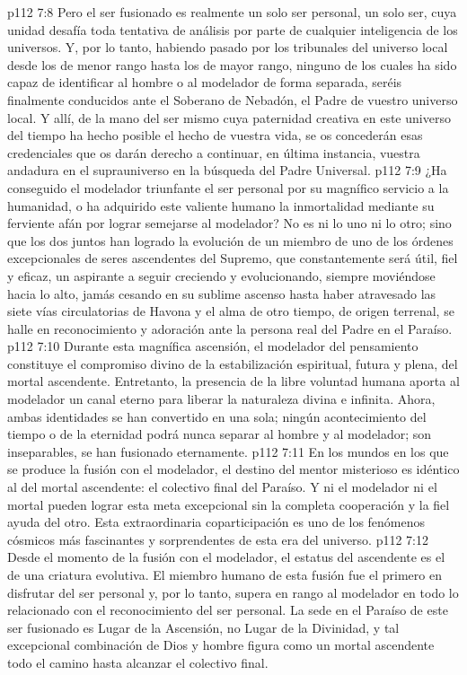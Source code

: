 \vs p112 7:8 Pero el ser fusionado es realmente un solo ser personal, un solo ser, cuya unidad desafía toda tentativa de análisis por parte de cualquier inteligencia de los universos. Y, por lo tanto, habiendo pasado por los tribunales del universo local desde los de menor rango hasta los de mayor rango, ninguno de los cuales ha sido capaz de identificar al hombre o al modelador de forma separada, seréis finalmente conducidos ante el Soberano de Nebadón, el Padre de vuestro universo local. Y allí, de la mano del ser mismo cuya paternidad creativa en este universo del tiempo ha hecho posible el hecho de vuestra vida, se os concederán esas credenciales que os darán derecho a continuar, en última instancia, vuestra andadura en el suprauniverso en la búsqueda del Padre Universal.
\vs p112 7:9 ¿Ha conseguido el modelador triunfante el ser personal por su magnífico servicio a la humanidad, o ha adquirido este valiente humano la inmortalidad mediante su ferviente afán por lograr semejarse al modelador? No es ni lo uno ni lo otro; sino que los dos juntos han logrado la evolución de un miembro de uno de los órdenes excepcionales de seres ascendentes del Supremo, que constantemente será útil, fiel y eficaz, un aspirante a seguir creciendo y evolucionando, siempre moviéndose hacia lo alto, jamás cesando en su sublime ascenso hasta haber atravesado las siete vías circulatorias de Havona y el alma de otro tiempo, de origen terrenal, se halle en reconocimiento y adoración ante la persona real del Padre en el Paraíso.
\vs p112 7:10 Durante esta magnífica ascensión, el modelador del pensamiento constituye el compromiso divino de la estabilización espiritual, futura y plena, del mortal ascendente. Entretanto, la presencia de la libre voluntad humana aporta al modelador un canal eterno para liberar la naturaleza divina e infinita. Ahora, ambas identidades se han convertido en una sola; ningún acontecimiento del tiempo o de la eternidad podrá nunca separar al hombre y al modelador; son inseparables, se han fusionado eternamente.
\vs p112 7:11 \pc En los mundos en los que se produce la fusión con el modelador, el destino del mentor misterioso es idéntico al del mortal ascendente: el colectivo final del Paraíso. Y ni el modelador ni el mortal pueden lograr esta meta excepcional sin la completa cooperación y la fiel ayuda del otro. Esta extraordinaria coparticipación es uno de los fenómenos cósmicos más fascinantes y sorprendentes de esta era del universo.
\vs p112 7:12 Desde el momento de la fusión con el modelador, el estatus del ascendente es el de una criatura evolutiva. El miembro humano de esta fusión fue el primero en disfrutar del ser personal y, por lo tanto, supera en rango al modelador en todo lo relacionado con el reconocimiento del ser personal. La sede en el Paraíso de este ser fusionado es Lugar de la Ascensión, no Lugar de la Divinidad, y tal excepcional combinación de Dios y hombre figura como un mortal ascendente todo el camino hasta alcanzar el colectivo final.
